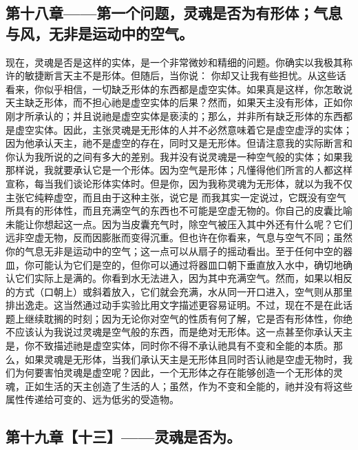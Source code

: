 
\subsection{第十八章——第一个问题，灵魂是否为有形体；气息与风，无非是运动中的空气。}

现在，灵魂是否是这样的实体，是一个非常微妙和精细的问题。你确实以我极其称许的敏捷断言天主不是形体。但随后，当你说： 你却又让我有些担忧。从这些话看来，你似乎相信，一切缺乏形体的东西都是虚空实体。如果真是这样，你怎敢说天主缺乏形体，而不担心祂是虚空实体的后果？然而，如果天主没有形体，正如你刚才所承认的；并且说祂是虚空实体是亵渎的；那么，并非所有缺乏形体的东西都是虚空实体。因此，主张灵魂是无形体的人并不必然意味着它是虚空虚浮的实体；因为他承认天主，祂不是虚空的存在，同时又是无形体。但请注意我的实际断言和你认为我所说的之间有多大的差别。我并没有说灵魂是一种空气般的实体；如果我那样说，我就要承认它是一个形体。因为空气是形体；凡懂得他们所言的人都这样宣称，每当我们谈论形体实体时。但是你，因为我称灵魂为无形体，就以为我不仅主张它纯粹虚空，而且由于这种主张，说它是 而我其实一定说过，它既没有空气所具有的形体性，而且充满空气的东西也不可能是空虚无物的。你自己的皮囊比喻未能让你想起这一点。因为当皮囊充气时，除空气被压入其中外还有什么呢？它们远非空虚无物，反而因膨胀而变得沉重。但也许在你看来，气息与空气不同；虽然你的气息无非是运动中的空气；这一点可以从扇子的摇动看出。至于任何中空的器皿，你可能认为它们是空的，但你可以通过将器皿口朝下垂直放入水中，确切地确认它们实际上是满的。你看到水无法进入，因为其中充满空气。然而，如果以相反的方式（口朝上）或斜着放入，它们就会充满，水从同一开口进入，空气则从那里排出逸走。这当然通过动手实验比用文字描述更容易证明。不过，现在不是在此话题上继续耽搁的时刻；因为无论你对空气的性质有何了解，它是否有形体性，你绝不应该认为我说过灵魂是空气般的东西，而是绝对无形体。这一点甚至你承认天主是，你不致描述祂是虚空实体，同时你不得不承认祂具有不变和全能的本质。那么，如果灵魂是无形体，当我们承认天主是无形体且同时否认祂是空虚无物时，我们为何要害怕灵魂是虚空呢？因此，一个无形体之存在能够创造一个无形体的灵魂，正如生活的天主创造了生活的人；虽然，作为不变和全能的，祂并没有将这些属性传递给可变的、远为低劣的受造物。\par


\subsection{第十九章【十三】——灵魂是否为。}

